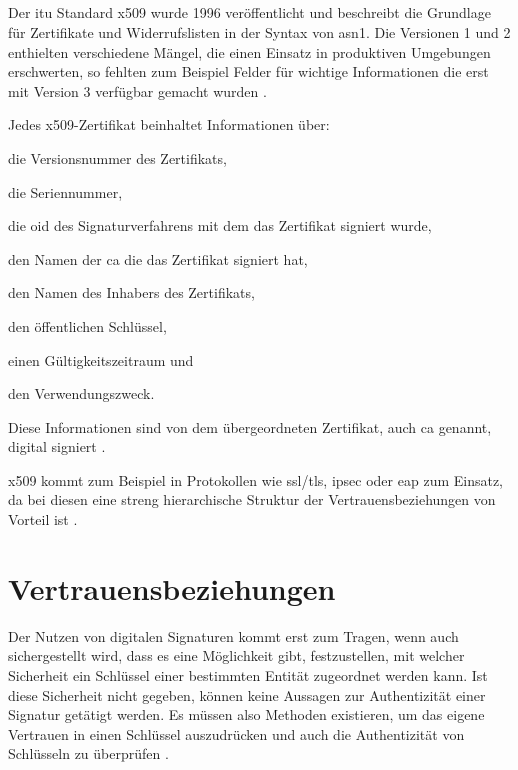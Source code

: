 \subsection{\protect{}}
\label{sec:GrundlagenDefinitionen:DigitaleSignaturen:Verfahren:x509}
Der \gls{itu} Standard \gls{x509} wurde 1996 veröffentlicht und beschreibt die Grundlage für Zertifikate und Widerrufslisten in der Syntax von \gls{asn1}. Die
Versionen 1 und 2 enthielten verschiedene Mängel, die einen Einsatz in produktiven Umgebungen erschwerten, so fehlten zum Beispiel Felder für wichtige
Informationen die erst mit Version 3 verfügbar gemacht wurden \cite{krypto-pki-internet}.

Jedes \gls{x509}-Zertifikat beinhaltet Informationen über:
\begin{itemize*}
    \item die Versionsnummer des Zertifikats,
    \item die Seriennummer,
    \item die \gls{oid} des Signaturverfahrens mit dem das Zertifikat signiert wurde,
    \item den Namen der \gls{ca} die das Zertifikat signiert hat,
    \item den Namen des Inhabers des Zertifikats,
    \item den öffentlichen Schlüssel,
    \item einen Gültigkeitszeitraum und
    \item den Verwendungszweck.
\end{itemize*}

Diese Informationen sind von dem übergeordneten Zertifikat, auch \gls{ca} genannt, digital signiert \cite{x509:ietf}.

\gls{x509} kommt zum Beispiel in Protokollen wie \gls{ssl}/\gls{tls}, \gls{ipsec} oder \gls{eap} zum Einsatz, da bei diesen eine streng hierarchische Struktur
der Vertrauensbeziehungen von Vorteil ist \cite{kits,tls:ietf}.

\section{Vertrauensbeziehungen}
\label{sec:GrundlagenDefinitionen:Vertrauen}
Der Nutzen von digitalen Signaturen kommt erst zum Tragen, wenn auch sichergestellt wird, dass es eine Möglichkeit gibt, festzustellen, mit welcher Sicherheit
ein Schlüssel einer bestimmten Entität zugeordnet werden kann. Ist diese Sicherheit nicht gegeben, können keine Aussagen zur Authentizität einer Signatur
getätigt werden. Es müssen also Methoden existieren, um das eigene Vertrauen in einen Schlüssel auszudrücken und auch die Authentizität von Schlüsseln
zu überprüfen \cite{krypto-pki-internet}.

